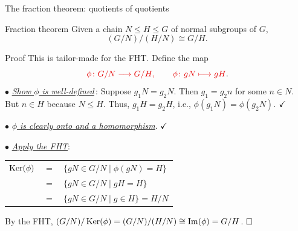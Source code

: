 \documentclass[8pt, handout]{beamer}
\newcommand{\Pause}{}      %
\begin{document}

\begin{frame}{The fraction theorem: quotients of quotients} \smallskip
  
  \begin{block}{Fraction theorem}
    Given a chain $N\leq H\leq G$ of normal subgroups of $G$,
    \[
    (G/N)/(H/N)\cong G/H.
    \]
  \end{block}
  
  \Pause
  
  \begin{exampleblock}{Proof}
    This is tailor-made for the FHT. Define the map
    \[
    \Alert{\phi\colon G/N\longto G/H,\qquad\phi\colon
      gN\longmapsto\Pause gH}.
    \]
    \pause $\bullet$ \underline{\emph{Show $\phi$ is well-defined}}\,:
    Suppose $g_1N=g_2N$. \Pause Then $g_1=g_2n$ for some $n\in
    N$. \Pause But $n\in H$ because $N\leq H$. \Pause Thus,
    $g_1H=g_2H$, \Pause i.e., $\phi(g_1N)=\phi(g_2N)$. $\hfill\checkmark$ 
    
    \medskip\pause
    
    $\bullet$ \underline{\emph{$\phi$ is clearly onto and a
        homomorphism}}. $\hfill\checkmark$
    
    \medskip\pause
    
    $\bullet$ \underline{\emph{Apply the FHT}}:
    \begin{center}
      \renewcommand{\arraystretch}{1.2}
      \begin{tabular}{rcl}
        $\operatorname{Ker}(\phi)$ & $=$ & $\big\{gN\in G/N \mid \phi(gN)=H\big\}$ \\ \Pause
        & $=$ & $\big\{gN\in G/N \mid gH=H\big\}$ \\ \Pause
        & $=$ & $\big\{gN\in G/N\mid g\in H\big\}\Pause=H/N$ \\
      \end{tabular}
    \end{center}
    \Pause By the FHT, $(G/N)/\Ker(\phi)=(G/N)/(H/N)\Pause\cong
    \Image(\phi)\Pause=G/H$. $\hfill\Box$
    
  \end{exampleblock}
  
\end{frame}

\end{document}
